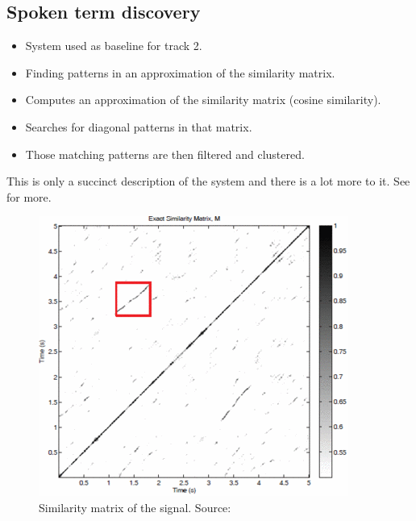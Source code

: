 \documentclass[final]{beamer}
\begin{document}
\begin{frame}[t]
\begin{multicols}{3}

\subsection{Spoken term discovery}

\begin{itemize}
\item System used as baseline for track 2\cite{versteeghetal2015}.
\item Finding patterns in an approximation of the similarity matrix.
\item Computes an approximation of the similarity matrix (cosine similarity).
\item Searches for diagonal patterns in that matrix.
\item Those matching patterns are then filtered and clustered.
\end{itemize}

This is only a succinct description of the system and there is a lot more to it. See \cite{jansenvandurme2011} for more.

\begin{figure}[ht!]
  \begin{center}
    \includegraphics[width=0.85\columnwidth]{similarity_matrix}
    \caption{\label{fig:system}Similarity matrix of the signal. Source: \cite{jansenvandurme2011}}
  \end{center}
\end{figure}


\end{multicols}
\end{frame}
\end{document}
